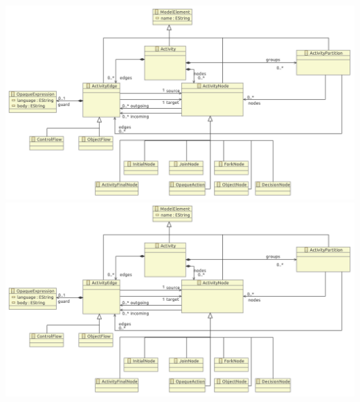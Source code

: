 \documentclass[a4paper,10pt]{article}
\begin{document}
\includegraphics[width=\textwidth]{4/original_minimal_metamodel_4}
\includegraphics[width=\textwidth]{5/original_minimal_metamodel_5}
\end{document}

